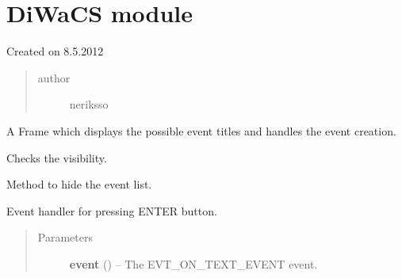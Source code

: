 \documentclass[letterpaper,10pt,english]{sphinxmanual}
\begin{document}
\section{DiWaCS module}
\label{diwacs:diwacs-module}\label{diwacs:module-diwacs}\label{diwacs::doc}
Created on 8.5.2012
\begin{quote}\begin{description}
\item[{author}] \leavevmode
neriksso

\end{description}\end{quote}

\begin{fulllineitems}
\label{diwacs:diwacs.EventList}
A Frame which displays the possible event titles and handles the event
creation.

\begin{fulllineitems}
\label{diwacs:diwacs.EventList.CheckVisibility}
Checks the visibility.

\end{fulllineitems}


\begin{fulllineitems}
\label{diwacs:diwacs.EventList.HideNow}
Method to hide the event list.

\end{fulllineitems}


\begin{fulllineitems}
\label{diwacs:diwacs.EventList.OnEnter}
Event handler for pressing ENTER button.
\begin{quote}\begin{description}
\item[{Parameters}] \leavevmode
\textbf{event} () -- The EVT\_ON\_TEXT\_EVENT event.

\end{description}\end{quote}


\end{fulllineitems}
\end{fulllineitems}
\end{document}
